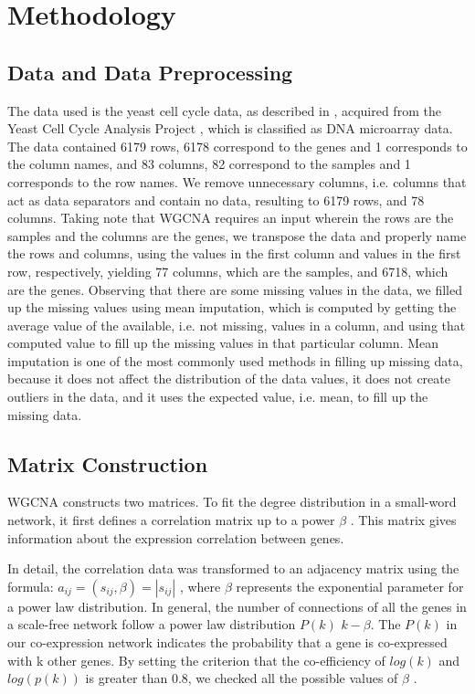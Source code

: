 \documentclass[sigconf,authordraft]{acmart}
\begin{document}
\section{Methodology}

\subsection{Data and Data Preprocessing}
The data used is the yeast cell cycle data, as described in \cite{ChoEtal1998}, acquired from the Yeast Cell Cycle Analysis Project \cite{SpellmanEtal1998}, which is classified as DNA microarray data. The data contained 6179 rows, 6178 correspond to the genes and 1 corresponds to the column names, and 83 columns, 82 correspond to the samples and 1 corresponds to the row names. We remove unnecessary columns, i.e. columns that act as data separators and contain no data, resulting to 6179 rows, and 78 columns. Taking note that WGCNA requires an input wherein the rows are the samples and the columns are the genes, we transpose the data and properly name the rows and columns, using the values in the first column and values in the first row, respectively, yielding 77 columns, which are the samples, and 6718, which are the genes. Observing that there are some missing values in the data, we filled up the missing values using mean imputation, which is computed by getting the average value of the available, i.e. not missing, values in a column, and using that computed value to fill up the missing values in that particular column. Mean imputation is one of the most commonly used methods in filling up missing data, because it does not affect the distribution of the data values, it does not create outliers in the data, and it uses the expected value, i.e. mean, to fill up the missing data.

\subsection{Matrix Construction}
WGCNA \cite{LangfelderHorvath2008} constructs two matrices. To fit the degree distribution in a small-word network, it first defines a correlation matrix up to a power $\beta$ . This matrix gives information about the expression correlation between genes.

In detail, the correlation data was transformed to an adjacency matrix using the formula: $a_{ij}=(s_{ij},\beta) =|s_{ij}|$ , where $\beta$ represents the exponential parameter for a power law distribution. In general, the number of connections of all the genes in a scale-free network follow a power law distribution $P(k)$ \texttildelow  $k-\beta$. The $P(k)$ in our co-expression network indicates the probability that a gene is co-expressed with k other genes. By setting the criterion that the co-efficiency of $log(k)$ and $log(p(k))$ is greater than 0.8, we checked all the possible values of $\beta$ \cite{HorvathZhangEtal2006}.
\end{document}
